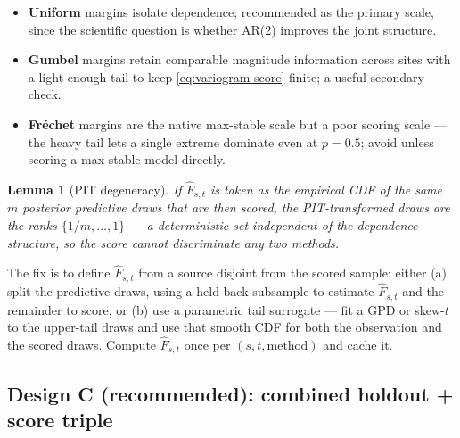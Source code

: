 \documentclass[11pt]{article}
\newtheorem{lemma}{Lemma}
\theoremstyle{definition}
\begin{document}
\begin{itemize}[leftmargin=1.6em, itemsep=2pt]
  \item \textbf{Uniform} margins isolate dependence; recommended as the
        primary scale, since the scientific question is whether AR(2)
        improves the joint structure.
  \item \textbf{Gumbel} margins retain comparable magnitude information
        across sites with a light enough tail to keep
        \eqref{eq:variogram-score} finite; a useful secondary check.
  \item \textbf{Fr\'echet} margins are the native max-stable scale but
        a poor scoring scale --- the heavy tail lets a single extreme
        dominate even at $p=0.5$; avoid unless scoring a max-stable
        model directly.
\end{itemize}

\begin{lemma}[PIT degeneracy]
\label{lem:pit-degeneracy}
If $\hat F_{s,t}$ is taken as the empirical CDF of the same $m$
posterior predictive draws that are then scored, the PIT-transformed
draws are the ranks $\{1/m,\dots,1\}$ --- a deterministic set
independent of the dependence structure, so the score cannot
discriminate any two methods.
\end{lemma}

The fix is to define $\hat F_{s,t}$ from a source disjoint from the
scored sample: either (a) split the predictive draws, using a held-back
subsample to estimate $\hat F_{s,t}$ and the remainder to score, or
(b) use a parametric tail surrogate --- fit a GPD or skew-$t$ to the
upper-tail draws and use that smooth CDF for both the observation and
the scored draws. Compute $\hat F_{s,t}$ once per
$(s,t,\text{method})$ and cache it.

\subsection{Design C (recommended): combined holdout + score triple}
\label{subsec:designC}
\end{document}

